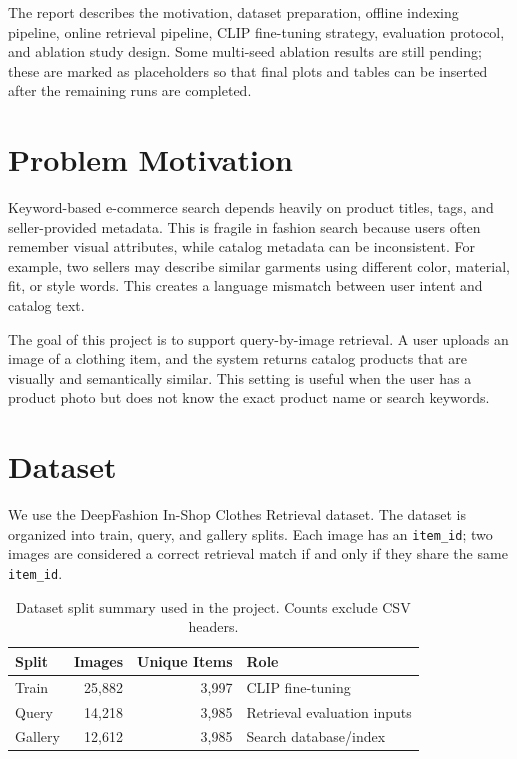 \documentclass[12pt, a4paper]{article}
\begin{document}
The report describes the motivation, dataset preparation, offline indexing pipeline, online retrieval pipeline, CLIP fine-tuning strategy, evaluation protocol, and ablation study design. Some multi-seed ablation results are still pending; these are marked as placeholders so that final plots and tables can be inserted after the remaining runs are completed.

\section{Problem Motivation}

Keyword-based e-commerce search depends heavily on product titles, tags, and seller-provided metadata. This is fragile in fashion search because users often remember visual attributes, while catalog metadata can be inconsistent. For example, two sellers may describe similar garments using different color, material, fit, or style words. This creates a language mismatch between user intent and catalog text.

The goal of this project is to support query-by-image retrieval. A user uploads an image of a clothing item, and the system returns catalog products that are visually and semantically similar. This setting is useful when the user has a product photo but does not know the exact product name or search keywords.

\section{Dataset}

We use the DeepFashion In-Shop Clothes Retrieval dataset. The dataset is organized into train, query, and gallery splits. Each image has an \texttt{item\_id}; two images are considered a correct retrieval match if and only if they share the same \texttt{item\_id}.

\begin{table}[H]
    \centering
    \caption{Dataset split summary used in the project. Counts exclude CSV headers.}
    \label{tab:dataset-summary}
    \begin{tabular}{lrrl}
        \toprule
        Split & Images & Unique Items & Role \\
        \midrule
        Train & 25,882 & 3,997 & CLIP fine-tuning \\
        Query & 14,218 & 3,985 & Retrieval evaluation inputs \\
        Gallery & 12,612 & 3,985 & Search database/index \\
        \bottomrule
    \end{tabular}
\end{table}
\end{document}
